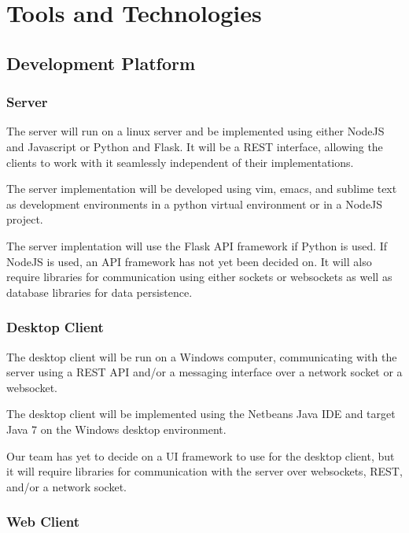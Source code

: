 \documentclass[11pt]{article}
\begin{document}
\section{Tools and Technologies}
\label{sec-6}

\subsection{Development Platform}
\label{sec-6-1}

\subsubsection{Server}
\label{sec-6-1-1}

The server will run on a linux server and be implemented using either
NodeJS and Javascript or Python and Flask. It will be a REST
interface, allowing the clients to work with it seamlessly independent
of their implementations. 

The server implementation will be developed using vim, emacs, and
sublime text as development environments in a python virtual
environment or in a NodeJS project.

The server implentation will use the Flask API framework if Python is
used. If NodeJS is used, an API framework has not yet been decided
on. It will also require libraries for communication using either
sockets or websockets as well as database libraries for data
persistence.

\subsubsection{Desktop Client}
\label{sec-6-1-2}

The desktop client will be run on a Windows computer, communicating
with the server using a REST API and/or a messaging interface over a
network socket or a websocket.

The desktop client will be implemented using the Netbeans Java IDE and
target Java 7 on the Windows desktop environment.

Our team has yet to decide on a UI framework to use for the desktop
client, but it will require libraries for communication with the
server over websockets, REST, and/or a network socket.

\subsubsection{Web Client}
\label{sec-6-1-3}
\end{document}
